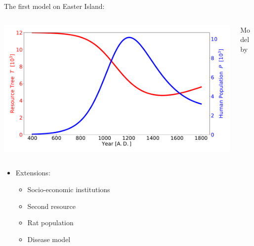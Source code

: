 \begin{frame}{The first model on Easter Island: \citet{Brander1998}}
\centering


\begin{columns} \begin{column}{0.7\textwidth}
		\includegraphics[width=\textwidth]{../../Thesis/images/Brander1998_EIBaseCase_presentation} 
\end{column}
\begin{column}{0.2\textwidth}
	{\footnotesize Model by \citet{Brander1998}}
\end{column}
\end{columns}
	

\begin{itemize}
\pause\item Extensions:
\begin{itemize}
	\item Socio-economic institutions \citep{Good2006}
	\item Second resource \citep{DAlessandro2007}
	\item Rat population \citep{Basener2008}
	\item Disease model \citep{Brandt2015}
\end{itemize} 
\end{itemize}                                                       
\end{frame}

